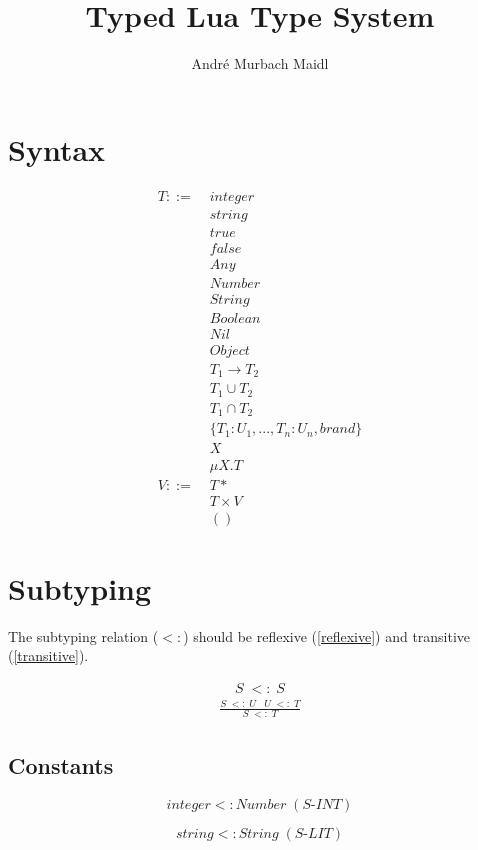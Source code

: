 \documentclass[12pt]{article}
\title{Typed Lua Type System}
\author{André Murbach Maidl}
\begin{document}
\maketitle

\section{Syntax}

\begin{align*}
T ::= \; & integer\\
& string\\
& true\\
& false\\
& Any\\
& Number\\
& String\\
& Boolean\\
& Nil\\
& Object\\
& T_1 \rightarrow T_2\\
& T_1 \cup T_2\\
& T_1 \cap T_2\\
& \{ T_1:U_1, ..., T_n:U_n, brand \}\\
& X\\
& \mu X.T\\
V ::= \; & T*\\
& T \times V\\
& ()
\end{align*}

\section{Subtyping}

The subtyping relation ($<:$) should be reflexive (\ref{reflexive})
and transitive (\ref{transitive}).

\begin{align}
\label{reflexive}
S \; <: \; S
\end{align}
\begin{align}
\label{transitive}
\frac{S \; <: \; U \;\;\; U\;  <: \; T}{S \; <: \; T}
\end{align}

\subsection{Constants}

\[
integer <: Number \; (\textit{S-INT})
\]

\[
string <: String \; (\textit{S-LIT})
\]
\end{document}
